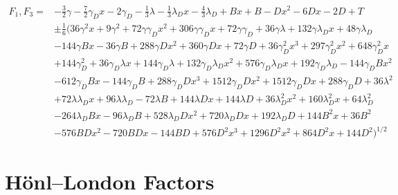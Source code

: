 \documentclass[11pt, twoside, fleqn]{report}
\begin{document}
\begin{align*}
    F_{1}, F_{3} = & -\tfrac{3}{2}\gamma - \tfrac{7}{2}\gamma_{D} x - 2 \gamma_{D} - \tfrac{1}{3}\lambda - \tfrac{1}{3}\lambda_{D} x - \tfrac{4}{3}\lambda_{D} + B x + B - D x^{2} - 6 D x - 2 D + T                           \\
                   & \pm \tfrac{1}{6}\bigl(36 \gamma^{2} x + 9 \gamma^{2} + 72 \gamma \gamma_{D} x^{2} + 306 \gamma \gamma_{D} x + 72 \gamma \gamma_{D} + 36 \gamma \lambda + 132 \gamma \lambda_{D} x + 48 \gamma \lambda_{D} \\
                   & - 144 \gamma B x - 36 \gamma B + 288 \gamma D x^{2} + 360 \gamma D x + 72 \gamma D + 36 \gamma_{D}^{2} x^{3} + 297 \gamma_{D}^{2} x^{2} + 648 \gamma_{D}^{2} x                                            \\
                   & + 144 \gamma_{D}^{2} + 36 \gamma_{D} \lambda x + 144 \gamma_{D} \lambda + 132 \gamma_{D} \lambda_{D} x^{2} + 576 \gamma_{D} \lambda_{D} x + 192 \gamma_{D} \lambda_{D} - 144 \gamma_{D} B x^{2}           \\
                   & - 612 \gamma_{D} B x - 144 \gamma_{D} B + 288 \gamma_{D} D x^{3} + 1512 \gamma_{D} D x^{2} + 1512 \gamma_{D} D x + 288 \gamma_{D} D + 36 \lambda^{2}                                                      \\
                   & + 72 \lambda \lambda_{D} x + 96 \lambda \lambda_{D} - 72 \lambda B + 144 \lambda D x + 144 \lambda D + 36 \lambda_{D}^{2} x^{2} + 160 \lambda_{D}^{2} x + 64 \lambda_{D}^{2}                              \\
                   & - 264 \lambda_{D} B x - 96 \lambda_{D} B + 528 \lambda_{D} D x^{2} + 720 \lambda_{D} D x + 192 \lambda_{D} D + 144 B^{2} x + 36 B^{2}                                                                     \\
                   & - 576 B D x^{2} - 720 B D x - 144 B D + 576 D^{2} x^{3} + 1296 D^{2} x^{2} + 864 D^{2} x + 144 D^{2}\bigr)^{1/2}
\end{align*}

\section{H\"onl--London Factors}
\end{document}
